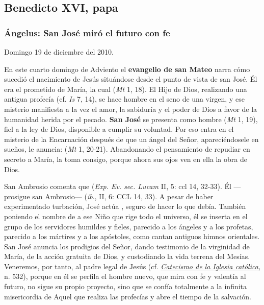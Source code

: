 \subsection{Benedicto XVI, papa}

\subsubsection{Ángelus: San José miró el futuro con fe}

Domingo 19 de diciembre del 2010.

En este cuarto domingo de Adviento el \textbf{evangelio de san Mateo} narra cómo sucedió el nacimiento de Jesús situándose desde el punto de vista de san José. Él era el prometido de María, la cual  (\emph{Mt} 1, 18). El Hijo de Dios, realizando una antigua profecía (cf. \emph{Is} 7, 14), se hace hombre en el seno de una virgen, y ese misterio manifiesta a la vez el amor, la sabiduría y el poder de Dios a favor de la humanidad herida por el pecado. \textbf{San José} se presenta como hombre  (\emph{Mt} 1, 19), fiel a la ley de Dios, disponible a cumplir su voluntad. Por eso entra en el misterio de la Encarnación después de que un ángel del Señor, apareciéndosele en sueños, le anuncia:  (\emph{Mt} 1, 20-21). Abandonando el pensamiento de repudiar en secreto a María, la toma consigo, porque ahora sus ojos ven en ella la obra de Dios.

San Ambrosio comenta que  (\emph{Exp. Ev. sec. Lucam} II, 5: ccl 14, 32-33). Él ---prosigue san Ambrosio---  (\emph{ib}., II, 6: CCL 14, 33). A pesar de haber experimentado turbación, José actúa , seguro de hacer lo que debía. También poniendo el nombre de  a ese Niño que rige todo el universo, él se inserta en el grupo de los servidores humildes y fieles, parecido a los ángeles y a los profetas, parecido a los mártires y a los apóstoles, como cantan antiguos himnos orientales. San José anuncia los prodigios del Señor, dando testimonio de la virginidad de María, de la acción gratuita de Dios, y custodiando la vida terrena del Mesías. Veneremos, por tanto, al padre legal de Jesús (cf. \emph{\href{http://www.vatican.va/archive/catechism_sp/p122a3p3_sp.html\#II\%20Los\%20misterios\%20de\%20la\%20infancia\%20y\%20de\%20la\%20vida\%20oculta\%20de\%20Jes\%C3\%BAs}{Catecismo de la Iglesia católica},} n. 532), porque en él se perfila el hombre nuevo, que mira con fe y valentía al futuro, no sigue su propio proyecto, sino que se confía totalmente a la infinita misericordia de Aquel que realiza las profecías y abre el tiempo de la salvación.

